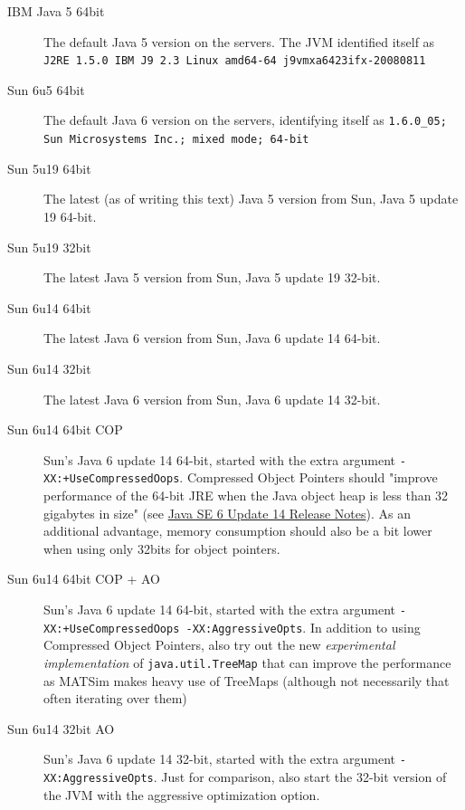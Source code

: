 \begin{description}
\item[IBM Java 5 64bit]\quad The default Java 5 version on the servers. The JVM identified itself as \texttt{J2RE 1.5.0 IBM J9 2.3 Linux amd64-64 j9vmxa6423ifx-20080811}
\item[Sun 6u5 64bit]\quad The default Java 6 version on the servers, identifying itself as \texttt{1.6.0\_05; Sun Microsystems Inc.; mixed mode; 64-bit}
\item[Sun 5u19 64bit]\quad The latest (as of writing this text) Java 5 version from Sun, Java 5 update 19 64-bit.
\item[Sun 5u19 32bit]\quad The latest Java 5 version from Sun, Java 5 update 19 32-bit.
\item[Sun 6u14 64bit]\quad The latest Java 6 version from Sun, Java 6 update 14 64-bit.
\item[Sun 6u14 32bit]\quad The latest Java 6 version from Sun, Java 6 update 14 32-bit.
\item[Sun 6u14 64bit COP]\quad Sun's Java 6 update 14 64-bit, started with the extra argument \texttt{-XX:+UseCompressedOops}. Compressed Object Pointers should "improve performance of the 64-bit JRE when the Java object heap is less than 32 gigabytes in size" (see \href{http://java.sun.com/javase/6/webnotes/6u14.html}{Java SE 6 Update 14 Release Notes}). As an additional advantage, memory consumption should also be a bit lower when using only 32bits for object pointers.
\item[Sun 6u14 64bit COP + AO]\quad Sun's Java 6 update 14 64-bit, started with the extra argument \texttt{-XX:+UseCompressedOops -XX:AggressiveOpts}. In addition to using Compressed Object Pointers, also try out the new \emph{experimental implementation} of \texttt{java.util.TreeMap} that can improve the performance as MATSim makes heavy use of TreeMaps (although not necessarily that often iterating over them)
\item[Sun 6u14 32bit AO]\quad Sun's Java 6 update 14 32-bit, started with the extra argument \texttt{-XX:AggressiveOpts}. Just for comparison, also start the 32-bit version of the JVM with the aggressive optimization option.
\end{description}

